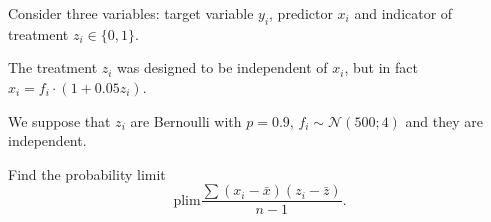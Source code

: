 
\begin{question}
Consider three variables: target variable \(y_i\), predictor \(x_i\) and indicator of treatment \(z_i \in \{0,1\}\).

The treatment \(z_i\) was designed to be independent of \(x_i\), but in fact \(x_i = f_i \cdot (1 + 0.05 z_i)\).

We suppose that \(z_i\) are Bernoulli with \(p=0.9\), \(f_i \sim \mathcal{N}(500;4)\) and they are independent.

Find the probability limit
\[
    \mathrm{plim} \frac{\sum (x_i - \bar x)(z_i - \bar z)}{n-1}.    
\]
\end{question}


